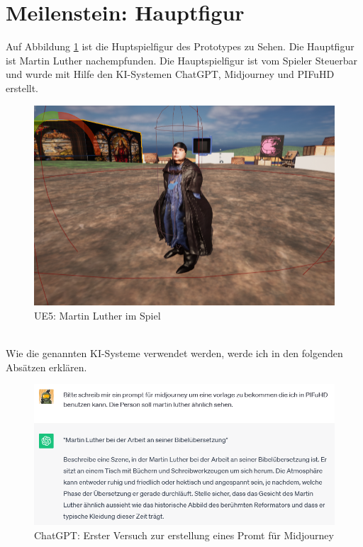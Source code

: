 \section {Meilenstein: Hauptfigur}
Auf Abbildung \ref{MartinLutherImSpiel} ist die Huptspielfigur des Prototypes zu Sehen. Die Hauptfigur ist Martin Luther nachempfunden. Die Hauptspielfigur ist vom Spieler Steuerbar und wurde mit Hilfe den KI-Systemen ChatGPT, Midjourney und PIFuHD erstellt.
\begin{figure}[h]
	\centering
	\includegraphics[width=14cm]{BilderFuerBA/MartinLutherImSpiel.png}
	\caption{UE5: Martin Luther im Spiel}
	\label{MartinLutherImSpiel}
\end{figure}
\\
Wie die genannten KI-Systeme verwendet werden, werde ich in den folgenden Absätzen erklären.
\begin{figure}[h]
	\centering
	\includegraphics[width=14cm]{BilderFuerBA/02.png}
	\caption{ChatGPT: Erster Versuch zur erstellung eines Promt für Midjourney}
	\label{ChatGPT_erster_Versuch_Midjourney_Promt}
\end{figure}
